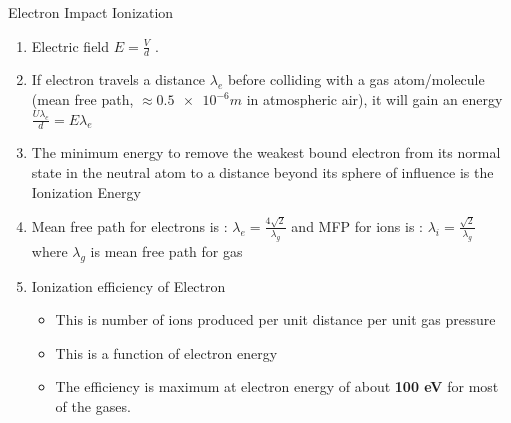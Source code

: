 \documentclass[11pt]{beamer}
\begin{document}
\begin{frame}{Electron Impact Ionization}

\begin{exampleblock}

\begin{enumerate}
		\item Electric field $ E = \frac{V}{d}$ .
\item If electron travels a distance $\lambda_{e} $  before colliding with a gas atom/molecule (mean free path,  $\approx \num[round-precision=2,round-mode=figures,scientific-notation=true]{0.5e-6}m$ in atmospheric air), it will gain an energy   $ \frac{U \lambda_{e}}{d} = E \lambda_{e} $
\item The minimum energy to remove the weakest bound electron from its normal state in the neutral atom to a distance beyond its sphere of influence is the Ionization Energy
\item Mean free path for electrons is : $ \lambda_{e} = \frac{4\sqrt{2}}{\lambda_{g}} $  and MFP for ions is : $ \lambda_{i} = \frac{\sqrt{2}}{\lambda_{g}} $ 
where $ \lambda_{g} $  is mean free path for gas 

\item Ionization efficiency of Electron
       \begin{itemize}
        \item This is number of ions produced per unit distance per unit gas pressure

        \item This is a function of electron energy

       
        \item The efficiency is maximum at electron energy of about \textbf{100 eV} for most of the gases.

       
       \end{itemize}
       
		
\end{enumerate}

		
\end{exampleblock}

\end{frame}
\end{document}
